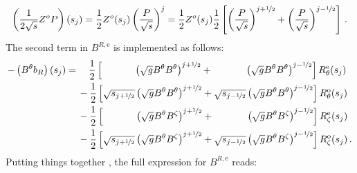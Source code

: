\begin{equation}
  \left( \frac{1}{2 \sqrt{s}} Z^o P \right) (s_j)
  = \frac{1}{2} Z^o(s_j) \left(\frac{P}{\sqrt{s}}\right)^j
  = \frac{1}{2} Z^o(s_j) \frac{1}{2} \left[ \left(\frac{P}{\sqrt{s}}\right)^{j+\nicefrac{1}{2}} + \left(\frac{P}{\sqrt{s}}\right)^{j-\nicefrac{1}{2}} \right] \, .
\end{equation}
The second term in $B^{R,\mathrm{e}}$ is implemented as follows:
\begin{align}
  - \left( B^\theta b_R \right) (s_j)
  =&\, \phantom{-}~ \frac{1}{2} \left[   \phantom{\sqrt{s_{j+\half}}} \left( \sqrt{g} B^\theta B^\theta \right)^{j+\half}
                                       + \phantom{\sqrt{s_{j-\half}}} \left( \sqrt{g} B^\theta B^\theta \right)^{j-\half} \right] R_\theta^\mathrm{e}(s_j) \nonumber \\
  ~&\,          -   \frac{1}{2} \left[            \sqrt{s_{j+\half}}  \left( \sqrt{g} B^\theta B^\theta \right)^{j+\half}
                                       +          \sqrt{s_{j-\half}}  \left( \sqrt{g} B^\theta B^\theta \right)^{j-\half} \right] R_\theta^\mathrm{o}(s_j) \nonumber \\
  ~&\,          -   \frac{1}{2} \left[   \phantom{\sqrt{s_{j+\half}}} \left( \sqrt{g} B^\theta  B^\zeta \right)^{j+\half}
                                       + \phantom{\sqrt{s_{j-\half}}} \left( \sqrt{g} B^\theta  B^\zeta \right)^{j-\half} \right]  R_\zeta^\mathrm{e}(s_j) \nonumber \\
  ~&\,          -   \frac{1}{2} \left[            \sqrt{s_{j+\half}}  \left( \sqrt{g} B^\theta  B^\zeta \right)^{j+\half}
                                       +          \sqrt{s_{j-\half}}  \left( \sqrt{g} B^\theta  B^\zeta \right)^{j-\half} \right]  R_\zeta^\mathrm{o}(s_j) \, .
\end{align}
Putting things together
, the full expression for $B^{R,\mathrm{e}}$ reads:
